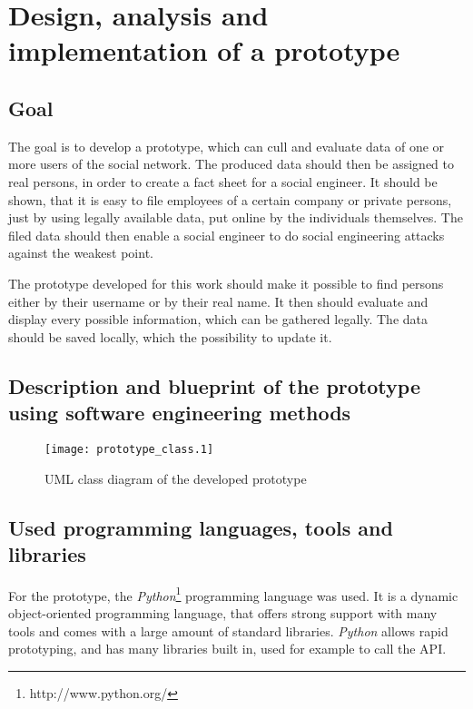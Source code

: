 \chapter{Design, analysis and implementation of a prototype}
\label{chapter:prototype}

\section{Goal}

The goal is to develop a prototype, which can cull and evaluate data of one or
more users of the \Twitter{} social network. The produced data should then be
assigned to real persons, in order to create a fact sheet for a social
engineer. It should be shown, that it is easy to file employees of a certain
company or private persons, just by using legally available data, put online by
the individuals themselves. The filed data should then enable a social
engineer to do social engineering attacks against the weakest point.

The prototype developed for this work should make it possible to find persons
either by their username or by their real name.
It then should evaluate and display every possible information, which can be
gathered legally. The data should be saved locally, which the possibility to
update it.

\section{Description and blueprint of the prototype using software engineering methods}

\begin{figure}
  \begin{center}
    \texttt{[image: prototype\_class.1]}
    \caption{UML class diagram  of the developed prototype}
  \end{center}
\end{figure}


\section{Used programming languages, tools and libraries}

For the prototype, the \textit{Python}\footnote{http://www.python.org/} programming
language was used. It is a dynamic object-oriented programming language, that
offers strong support with many tools and comes with a large amount of standard
libraries. \textit{Python} allows rapid prototyping, and has many libraries built
in, used for example to call the \Twitter{} API.


